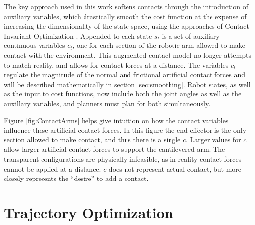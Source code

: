 \documentclass[../thesis.tex]{subfiles}
\begin{document}
The key approach used in this work softens contacts through the introduction of auxiliary variables, which drastically smooth the cost function at the expense of increasing the dimensionality of the state space, using the approaches of Contact Invariant Optimization \cite{Mordatch2012}.
Appended to each state $s_t$ is a set of auxiliary continuous variables $c_t$, one for each section of the robotic arm allowed to make contact with the environment.
This augmented contact model no longer attempts to match reality, and allows for contact forces at a distance.
The variables $c_t$ regulate the magnitude of the normal and frictional artificial contact forces and will be described mathematically in section \ref{sec:smoothing}.
Robot states, as well as the input to cost functions, now include both the joint angles as well as the auxillary variables, and planners must plan for both simultaneously.

Figure \ref{fig:ContactArms} helps give intuition on how the contact variables influence these artificial contact forces.
In this figure the end effector is the only section allowed to make contact, and thus there is a single $c$.
Larger values for $c$ allow larger artificial contact forces to support the cantilevered arm.
The transparent configurations are physically infeasible, as in reality contact forces cannot be applied at a distance.
$c$ does not represent actual contact, but more closely represents the ``desire'' to add a contact.











\section{Trajectory Optimization} \label{sec:trajectory_optimization}
\end{document}
